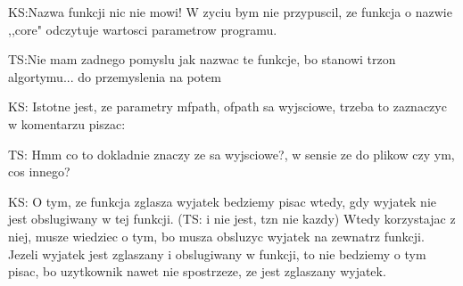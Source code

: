 
\begin{DoxyRefList}
\item[\label{todo__todo000004}%
\Hypertarget{todo__todo000004}%
Składowa \mbox{\hyperlink{_service_8h_a7d8249df16f85a510eff3384f41abf9d}{core}} (lcities $\ast$\&p\+Name, pathtab $\ast$\&path, ldirect $\ast$\&route, ostream \&outfile, istream \&rfile)]KS\+:Nazwa funkcji nic nie mowi! W zyciu bym nie przypuscil, ze funkcja o nazwie ,,core" odczytuje wartosci parametrow programu. 

TS\+:Nie mam zadnego pomyslu jak nazwac te funkcje, bo stanowi trzon algortymu... do przemyslenia na potem  
\item[\label{todo__todo000002}%
\Hypertarget{todo__todo000002}%
Składowa \mbox{\hyperlink{_service_8h_acdae817f32d56995307d1fe131fdc94f}{doparameters}} (int paramixmax, char $\ast$params\mbox{[}\mbox{]}, string \&mfpath, string \&ofpath, string \&rfpath, bool \&wasrf, bool \&wasof)]KS\+: Istotne jest, ze parametry mfpath, ofpath sa wyjsciowe, trzeba to zaznaczyc w komentarzu piszac\+:

TS\+: Hmm co to dokladnie znaczy ze sa wyjsciowe?, w sensie ze do plikow czy ym, cos innego?  
\item[\label{todo__todo000001}%
\Hypertarget{todo__todo000001}%
Składowa \mbox{\hyperlink{_mapa_8cpp_ac0a7634bf3f7b6b71ec101f221a37a9a}{main}} (int paramixmax, char $\ast$params\mbox{[}\mbox{]})]KS\+: O tym, ze funkcja zglasza wyjatek bedziemy pisac wtedy, gdy wyjatek nie jest obslugiwany w tej funkcji. (TS\+: i nie jest, tzn nie kazdy) Wtedy korzystajac z niej, musze wiedziec o tym, bo musza obsluzyc wyjatek na zewnatrz funkcji. Jezeli wyjatek jest zglaszany i obslugiwany w funkcji, to nie bedziemy o tym pisac, bo uzytkownik nawet nie spostrzeze, ze jest zglaszany wyjatek. 
\end{DoxyRefList}